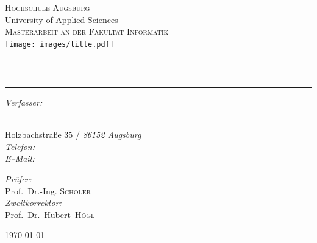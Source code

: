 \begin{titlepage}
\pagecolor{ThesisBackColor}
\begin{center}

\color{ThesisFontColor}
\textsc{\huge Hochschule Augsburg}\\[0.2cm]
\large University of Applied Sciences\\[1cm]
\textsc{\LARGE Masterarbeit an der Fakultät Informatik}\\[0.5cm]
\vspace{1em}
\texttt{[image: images/title.pdf]}~\\[1cm]


\rule{\linewidth}{0.5mm}

{\vspace{0.1cm}\Huge\bfseries \ThesisTitle\\[0.3cm]}
\rule{\linewidth}{0.5mm}

\vspace{0.5cm}

\noindent
\begin{minipage}[t]{0.4\textwidth}
\begin{flushleft} \large
\emph{Verfasser:}\\
\textnormal{\ThesisPreName~\textsc{\ThesisSurName}} \\
\vspace{1.2em}
\begin{singlespace}
  \normalsize
  \textnormal{Holzbachstraße 35} / \emph{86152 Augsburg} \\
  \emph{Telefon:} \texttt{\ThesisPhone} \\
  \emph{E--Mail:} \texttt{\ThesisMail}
\end{singlespace}
\end{flushleft}
\end{minipage}%
\begin{minipage}[t]{0.4\textwidth}
\begin{flushright} \large
\emph{Prüfer:} \\
\textnormal{Prof.\ Dr.-Ing. \textsc{Schöler}} \\
\vspace{1em}
\emph{Zweitkorrektor:} \\
\textnormal{Prof.\ Dr.\ Hubert\  \textsc{Högl}} \\
\end{flushright}
\end{minipage}

\vfill

{\large \today}
\end{center}
\end{titlepage}
\nopagecolor

